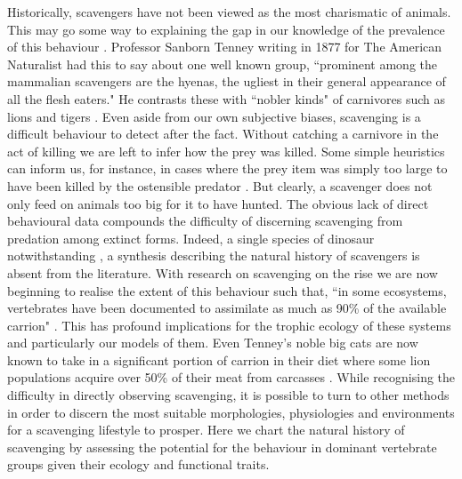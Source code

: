 \documentclass[a4paper,12pt]{article}
\begin{document}
Historically, scavengers have not been viewed as the most charismatic of animals.
This may go some way to explaining the gap in our knowledge of the prevalence of this behaviour \citep{devault2003scavenging}.
Professor Sanborn Tenney writing in 1877 for The American Naturalist had this to say about one well known group, ``prominent among the mammalian scavengers are the hyenas, the ugliest in their general appearance of all the flesh eaters."
He contrasts these with ``nobler kinds" of carnivores such as lions and tigers \citep{tenney1877few}.
Even aside from our own subjective biases, scavenging is a difficult behaviour to detect after the fact.
Without catching a carnivore in the act of killing we are left to infer how the prey was killed.
Some simple heuristics can inform us, for instance, in cases where the prey item was simply too large to have been killed by the ostensible predator \citep{pobiner2008paleoecological}.
But clearly, a scavenger does not only feed on animals too big for it to have hunted.
The obvious lack of direct behavioural data compounds the difficulty of discerning scavenging from predation among extinct forms.
Indeed, a single species of dinosaur notwithstanding \citep{carbone2011intra}, a synthesis describing the natural history of scavengers is absent from the literature.
With research on scavenging on the rise \citep{manga2006vulture} we are now beginning to realise the extent of this behaviour such that, ``in some ecosystems, vertebrates have been documented to assimilate as much as 90\% of the available carrion" \citep{beasley2015vertebrates}.
This has profound implications for the trophic ecology of these systems and particularly our models of them.
Even Tenney’s noble big cats are now known to take in a significant portion of carrion in their diet where some lion populations acquire over 50\% of their meat from carcasses \citep{jones2015african}.
While recognising the difficulty in directly observing scavenging, it is possible to turn to other methods in order to discern the most suitable morphologies, physiologies and environments for a scavenging lifestyle to prosper.
Here we chart the natural history of scavenging by assessing the potential for the behaviour in dominant vertebrate groups given their ecology and functional traits.
\end{document}
